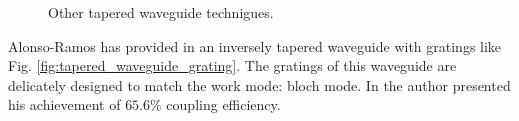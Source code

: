 \begin{figure}[!ht]
\centering
{}
 \caption{Other tapered waveguide technigues.}

\end{figure}
Alonso-Ramos has provided in \cite{fiber_to_chip_grating_waveguides} an inversely tapered waveguide with gratings like Fig. \ref{fig:tapered_waveguide_grating}. The gratings of this waveguide are delicately designed to match the work mode: bloch mode. In \cite{fiber_to_chip_grating_waveguides} the author presented his achievement of $65.6\%$ coupling efficiency. \\
 
